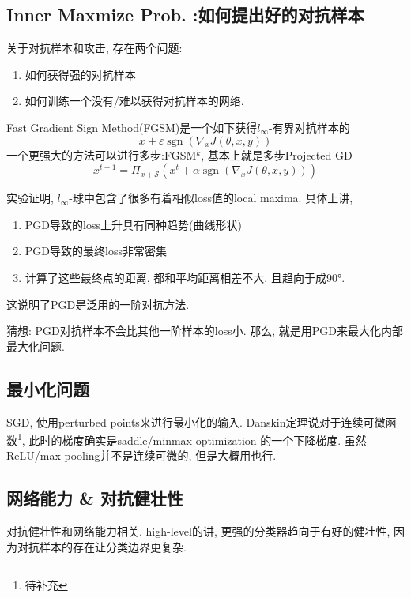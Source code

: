 \documentclass{article}
\begin{document}
\subsection{Inner Maxmize Prob. :如何提出好的对抗样本}
关于对抗样本和攻击, 存在两个问题:
\begin{enumerate}
    \item 如何获得强的对抗样本
    \item 如何训练一个没有/难以获得对抗样本的网络.
\end{enumerate}

Fast Gradient Sign Method(FGSM)是一个如下获得$l_\infty$-有界对抗样本的
\begin{equation}
    x+\varepsilon \operatorname{sgn}\left(\nabla_{x} J(\theta, x, y)\right)
\end{equation}
一个更强大的方法可以进行多步:FGSM$^k$, 基本上就是多步Projected GD
\begin{equation}
    x^{t+1}=\Pi_{x+\mathcal{S}}\left(x^{t}+\alpha \operatorname{sgn}\left(\nabla_{x} J(\theta, x, y)\right)\right)
\end{equation}

实验证明, $l_\infty$-球中包含了很多有着相似loss值的local maxima. 具体上讲, 
\begin{enumerate}
    \item PGD导致的loss上升具有同种趋势(曲线形状)
    \item PGD导致的最终loss非常密集
    \item 计算了这些最终点的距离, 都和平均距离相差不大, 且趋向于成90°.
\end{enumerate}
这说明了PGD是泛用的一阶对抗方法. 

猜想: PGD对抗样本不会比其他一阶样本的loss小. 那么, 就是用PGD来最大化内部最大化问题.

\subsection{最小化问题}

SGD, 使用perturbed points来进行最小化的输入. Danskin定理说对于连续可微函数\footnote{待补充}, 此时的梯度确实是saddle/minmax optimization 的一个下降梯度. 虽然ReLU/max-pooling并不是连续可微的, 但是大概用也行.

\subsection{网络能力 \& 对抗健壮性}

对抗健壮性和网络能力相关. high-level的讲, 更强的分类器趋向于有好的健壮性, 因为对抗样本的存在让分类边界更复杂.
\end{document}
